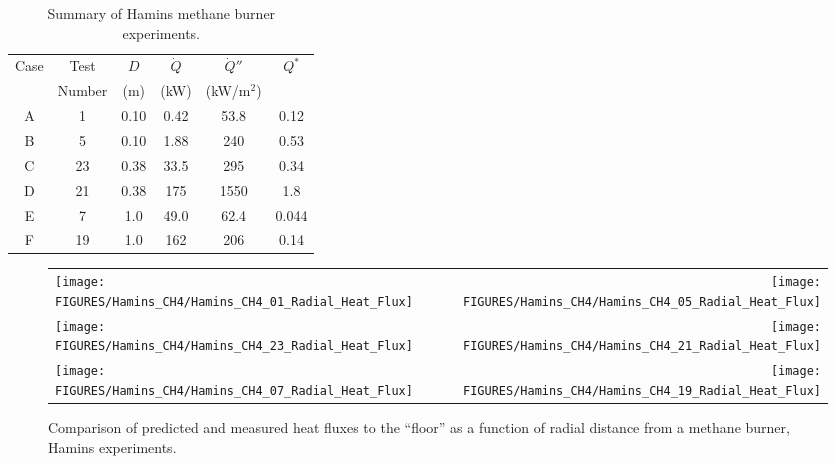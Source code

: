 \begin{table}[ht]
\caption{Summary of Hamins methane burner experiments. }
\begin{center}
\begin{tabular}{|c|c|c|c|c|c|}
\hline
Case     & Test     & $D$  & $\dot{Q}$   &  $\dot{Q}''$   & $Q^*$   \\
         & Number   & (m)  & (kW)        &  (kW/m$^2$)    &         \\ \hline \hline
A        & 1        & 0.10 & 0.42        &  53.8          & 0.12    \\ \hline
B        & 5        & 0.10 & 1.88        &  240           & 0.53    \\ \hline
C        & 23       & 0.38 & 33.5        &  295           & 0.34    \\ \hline
D        & 21       & 0.38 & 175         &  1550          & 1.8     \\ \hline
E        & 7        & 1.0  & 49.0        &  62.4          & 0.044   \\ \hline
F        & 19       & 1.0  & 162         &  206           & 0.14    \\ \hline
\end{tabular}
\end{center}
\label{Hamins_Table}
\end{table}

\newpage

\begin{figure}[p]
\begin{tabular*}{\textwidth}{l@{\extracolsep{\fill}}r}
\texttt{[image: FIGURES/Hamins\_CH4/Hamins\_CH4\_01\_Radial\_Heat\_Flux]} &
\texttt{[image: FIGURES/Hamins\_CH4/Hamins\_CH4\_05\_Radial\_Heat\_Flux]} \\
\texttt{[image: FIGURES/Hamins\_CH4/Hamins\_CH4\_23\_Radial\_Heat\_Flux]} &
\texttt{[image: FIGURES/Hamins\_CH4/Hamins\_CH4\_21\_Radial\_Heat\_Flux]} \\
\texttt{[image: FIGURES/Hamins\_CH4/Hamins\_CH4\_07\_Radial\_Heat\_Flux]} &
\texttt{[image: FIGURES/Hamins\_CH4/Hamins\_CH4\_19\_Radial\_Heat\_Flux]}
\end{tabular*}
\label{Hamins_CH4_Radial}
\caption[Radial heat flux predictions, Hamins methane burner experiments.]
{Comparison of predicted and measured heat fluxes to the ``floor'' as a function of radial distance from a methane burner, Hamins experiments.}
\end{figure}

